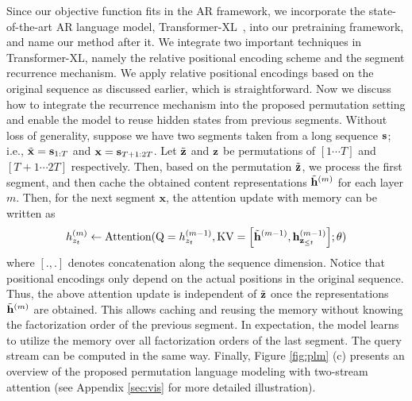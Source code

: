 Since our objective function fits in the AR framework, 
we incorporate the state-of-the-art AR language model, Transformer-XL~\cite{dai2019transformer}, into our pretraining framework, and name our method after it.
We integrate two important techniques in Transformer-XL, namely the relative positional encoding scheme and the segment recurrence mechanism.
We apply relative positional encodings based on the original sequence as discussed earlier, which is straightforward.
Now we discuss how to integrate the recurrence mechanism into the proposed permutation setting and enable the model to reuse hidden states from previous segments. 
Without loss of generality, suppose we have two segments taken from a long sequence ${\mathbf{s}}$; i.e., $\tilde{{\mathbf{x}}} = {\mathbf{s}}_{1:T}$ and ${\mathbf{x}} = \mathbf{s}_{T+1:2T}$. Let $\tilde{{\mathbf{z}}}$ and ${\mathbf{z}}$ be permutations of $[1\cdots T]$ and $[T+1 \cdots 2T]$ respectively. 
Then, based on the permutation $\tilde{{\mathbf{z}}}$, we process the first segment, and then cache the obtained content representations $\tilde{{\mathbf{h}}}^{(m)}$ for each layer $m$. 
Then, for the next segment $\mathbf{x}$, the attention update with memory can be written as
\[
	h_{z_t}^{(m)} \gets \text{Attention} (\text{Q} = h_{z_t}^{(m - 1)}, \text{KV} = \sbr{ \tilde{\rvh}^{(m - 1)}, \rvh_{\rvz_{\leq t}}^{(m - 1)} }; \theta)
\]
where $[.,.]$ denotes concatenation along the sequence dimension. 
Notice that positional encodings only depend on the actual positions in the original sequence. Thus, the above attention update is independent of $\tilde{{\mathbf{z}}}$ once the representations $\tilde{{\mathbf{h}}}^{(m)}$ are obtained. 
This allows caching and reusing the memory without knowing the factorization order of the previous segment.
In expectation, the model learns to utilize the memory over all factorization orders of the last segment.
The query stream can be computed in the same way.
Finally, Figure \ref{fig:plm} (c) presents an overview of the proposed permutation language modeling with two-stream attention (see Appendix \ref{sec:vis} for more detailed illustration).

